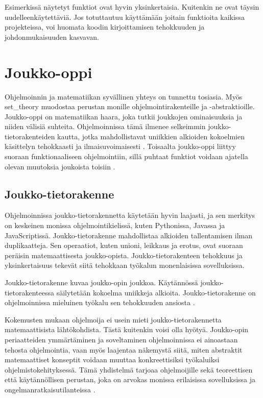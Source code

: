 Esimerkissä näytetyt funktiot ovat hyvin yksinkertaisia. Kuitenkin ne ovat täysin uudelleenkäytettäviä. Jos totuttautuu käyttämään joitain funktioita kaikissa projekteissa, voi huomata koodin kirjoittamisen tehokkuuden ja johdonmukaisuuden kasvavan.

\section{Joukko-oppi}

Ohjelmoinnin ja matematiikan syvällinen yhteys on tunnettu tosiasia. Myös \gls{set_theory} muodostaa perustan monille ohjelmointirakenteille ja -abstraktioille. Joukko-oppi on matematiikan haara, joka tutkii joukkojen ominaisuuksia ja niiden välisiä suhteita. Ohjelmoinnissa tämä ilmenee selkeimmin joukko-tietorakenteiden kautta, jotka mahdollistavat uniikkien alkioiden kokoelmien käsittelyn tehokkaasti ja ilmaisuvoimaisesti \cite{mdn_set,mdn_set_methods}. Toisaalta joukko-oppi liittyy suoraan funktionaaliseen ohjelmointiin, sillä puhtaat funktiot voidaan ajatella olevan muutoksia joukoista toisiin \cite{bartosz_category_for_progamers}.

\subsection{Joukko-tietorakenne}

Ohjelmoinnissa joukko-tietorakennetta käytetään hyvin laajasti, ja sen merkitys on keskeinen monissa ohjelmointikielissä, kuten Pythonissa, Javassa ja JavaScriptissä. Joukko-tietorakenne mahdollistaa alkioiden tallentamisen ilman duplikaatteja. Sen operaatiot, kuten unioni, leikkaus ja erotus, ovat suoraan peräisin matemaattisesta joukko-opista. Joukko-tietorakenteen tehokkuus ja yksinkertaisuus tekevät siitä tehokkaan työkalun monenlaisissa sovelluksissa. \citep{mdn_set,ecma_spec}

Joukko-tietorakenne kuvaa joukko-opin joukkoa. Käytännössä joukko-tietorakenteessa säilytetään kokoelma uniikkeja alkioita. Joukko-tietorakenne on ohjelmoinnissa mieluinen työkalu sen tehokkuuden ansiosta \cite{ecma_spec}.

Kokemusten mukaan ohjelmoija ei usein mieti joukko-tietorakennetta matemaattisista lähtökohdista. Tästä kuitenkin voisi olla hyötyä. Joukko-opin periaatteiden ymmärtäminen ja soveltaminen ohjelmoinnissa ei ainoastaan tehosta ohjelmointia, vaan myös laajentaa näkemystä siitä, miten abstraktit matemaattiset konseptit voidaan muuttaa konkreettisiksi työkaluiksi ohjelmistokehityksessä. Tämä yhdistelmä tarjoaa ohjelmoijille sekä teoreettisen että käytännöllisen perustan, joka on arvokas monissa erilaisissa sovelluksissa ja ongelmanratkaisutilanteissa \cite{bartosz_category_for_progamers}.

